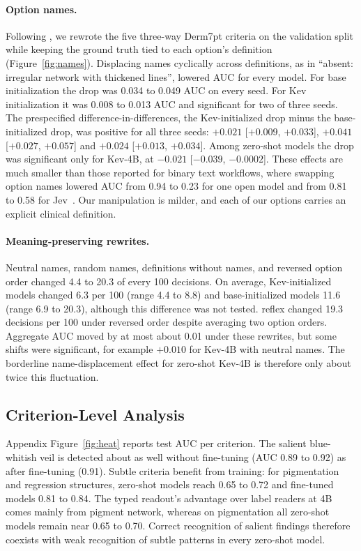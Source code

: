 \documentclass{article}
\begin{document}
\paragraph{Option names.} Following \citet{sun2026typesafe}, we rewrote the five three-way Derm7pt criteria on the validation split while keeping the ground truth tied to each option's definition (Figure~\ref{fig:names}). Displacing names cyclically across definitions, as in ``absent: irregular network with thickened lines'', lowered AUC for every model. For base initialization the drop was 0.034 to 0.049 AUC on every seed. For Kev initialization it was 0.008 to 0.013 AUC and significant for two of three seeds. The prespecified difference-in-differences, the Kev-initialized drop minus the base-initialized drop, was positive for all three seeds: $+0.021$ [$+0.009$, $+0.033$], $+0.041$ [$+0.027$, $+0.057$] and $+0.024$ [$+0.013$, $+0.034$]. Among zero-shot models the drop was significant only for Kev-4B, at $-0.021$ [$-0.039$, $-0.0002$]. These effects are much smaller than those reported for binary text workflows, where swapping option names lowered AUC from 0.94 to 0.23 for one open model and from 0.81 to 0.58 for Jev~\citep{sun2026typesafe}. Our manipulation is milder, and each of our options carries an explicit clinical definition.

\paragraph{Meaning-preserving rewrites.} Neutral names, random names, definitions without names, and reversed option order changed 4.4 to 20.3 of every 100 decisions. On average, Kev-initialized models changed 6.3 per 100 (range 4.4 to 8.8) and base-initialized models 11.6 (range 6.9 to 20.3), although this difference was not tested. reflex changed 19.3 decisions per 100 under reversed order despite averaging two option orders. Aggregate AUC moved by at most about 0.01 under these rewrites, but some shifts were significant, for example $+0.010$ for Kev-4B with neutral names. The borderline name-displacement effect for zero-shot Kev-4B is therefore only about twice this fluctuation.

\subsection{Criterion-Level Analysis}
Appendix Figure~\ref{fig:heat} reports test AUC per criterion. The salient blue-whitish veil is detected about as well without fine-tuning (AUC 0.89 to 0.92) as after fine-tuning (0.91). Subtle criteria benefit from training: for pigmentation and regression structures, zero-shot models reach 0.65 to 0.72 and fine-tuned models 0.81 to 0.84. The typed readout's advantage over label readers at 4B comes mainly from pigment network, whereas on pigmentation all zero-shot models remain near 0.65 to 0.70. Correct recognition of salient findings therefore coexists with weak recognition of subtle patterns in every zero-shot model.
\end{document}
